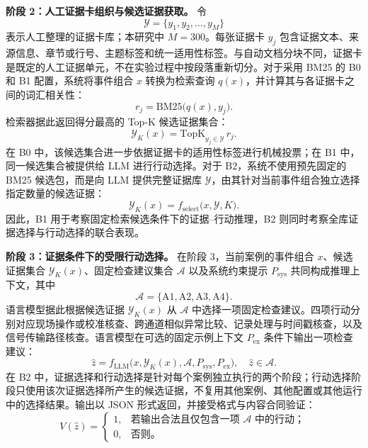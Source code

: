 \textbf{阶段 2：人工证据卡组织与候选证据获取。}
令
\begin{equation}
\mathcal{Y}=\{y_1,y_2,\ldots,y_M\}
\label{eq:evidence-library}
\end{equation}
表示人工整理的证据卡库；本研究中 \(M=300\)。每张证据卡 \(y_j\) 包含证据文本、来源信息、章节或行号、主题标签和统一适用性标签。与自动文档分块不同，证据卡是既定的人工证据单元，不在实验过程中按段落重新切分。对于采用 BM25 的 B0 和 B1 配置，系统将事件组合 \(x\) 转换为检索查询 \(q(x)\)，并计算其与各证据卡之间的词汇相关性：
\begin{equation}
r_j=\mathrm{BM25}\bigl(q(x),y_j\bigr).
\label{eq:bm25-score}
\end{equation}
检索器据此返回得分最高的 Top-K 候选证据集合：
\begin{equation}
\mathcal{Y}_K(x)=\mathrm{TopK}_{y_j\in\mathcal{Y}}\, r_j.
\label{eq:bm25-topk}
\end{equation}
在 B0 中，该候选集合进一步依据证据卡的适用性标签进行机械投票；在 B1 中，同一候选集合被提供给 LLM 进行行动选择。对于 B2，系统不使用预先固定的 BM25 候选包，而是向 LLM 提供完整证据库 \(\mathcal{Y}\)，由其针对当前事件组合独立选择指定数量的候选证据：
\begin{equation}
\mathcal{Y}_K(x)=f_{\mathrm{select}}\bigl(x,\mathcal{Y},K\bigr).
\label{eq:llm-select-topk}
\end{equation}
因此，B1 用于考察固定检索候选条件下的证据--行动推理，B2 则同时考察全库证据选择与行动选择的联合表现。

\textbf{阶段 3：证据条件下的受限行动选择。}
在阶段 3，当前案例的事件组合 \(x\)、候选证据集合 \(\mathcal{Y}_K(x)\)、固定检查建议集合 \(\mathcal{A}\) 以及系统约束提示 \(P_{\mathrm{sys}}\) 共同构成推理上下文，其中
\begin{equation}
\mathcal{A}=\{\mathrm{A1},\mathrm{A2},\mathrm{A3},\mathrm{A4}\}.
\label{eq:action-space}
\end{equation}
语言模型据此根据候选证据 \(\mathcal{Y}_K(x)\) 从 \(\mathcal{A}\) 中选择一项固定检查建议。四项行动分别对应现场操作或校准核查、跨通道相似异常比较、记录处理与时间戳核查，以及信号传输路径核查。语言模型在可选的固定示例上下文 \(P_{\mathrm{ex}}\) 条件下输出一项检查建议：
\begin{equation}
\hat{z}=f_{\mathrm{LLM}}\bigl(x,\mathcal{Y}_K(x),\mathcal{A},P_{\mathrm{sys}},P_{\mathrm{ex}}\bigr),
\quad \hat{z}\in\mathcal{A}.
\label{eq:action-selection}
\end{equation}
在 B2 中，证据选择和行动选择是针对每个案例独立执行的两个阶段；行动选择阶段只使用该次证据选择所产生的候选证据，不复用其他案例、其他配置或其他运行中的选择结果。输出以 JSON 形式返回，并接受格式与内容合同验证：
\begin{equation}
V(\hat{z})=
\begin{cases}
1, & \text{若输出合法且仅包含一项 } \mathcal{A} \text{ 中的行动；}\\
0, & \text{否则。}
\end{cases}
\label{eq:action-contract}
\end{equation}

